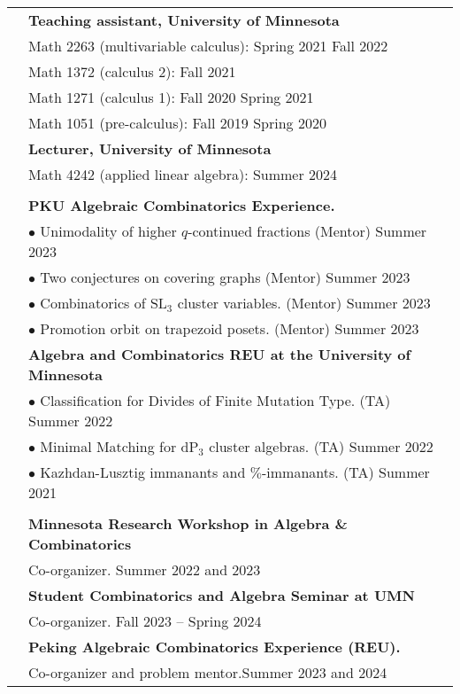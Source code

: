 \documentclass[letterpaper, 11pt,times]{article}
\newcommand{\mycolor}[0]{\color{RoyalBlue}}
\newlength{\myl}
\newcommand{\ind}[0]{\hspace{\myl}}
\newlength{\newl}
\begin{document}
\begin{longtable}{p{1in}p{5in}}
{\mycolor{Teaching}} 
& \textbf{Teaching assistant, University of Minnesota}  \\
&\ind  Math 2263 (multivariable calculus): Spring 2021 Fall 2022\\
&\ind  Math 1372 (calculus 2): Fall 2021\\
&\ind  Math 1271 (calculus 1): Fall 2020 Spring 2021\\
&\ind  Math 1051 (pre-calculus): Fall 2019 Spring 2020\\
& \textbf{Lecturer, University of Minnesota}  \\
&\ind  Math 4242 (applied linear algebra): Summer 2024\\
\\
{\mycolor{Mentoring}} 
&\textbf{PKU Algebraic Combinatorics Experience.}\\
&\ind $\bullet$ Unimodality of higher $q$-continued fractions (Mentor) \hfill Summer 2023\\
&\ind $\bullet$ Two conjectures on covering graphs (Mentor) \hfill Summer 2023\\
&\ind $\bullet$ Combinatorics of $\text{SL}_3$ cluster variables. (Mentor) \hfill Summer 2023\\
&\ind $\bullet$ Promotion orbit on trapezoid posets. (Mentor) \hfill Summer 2023\\
& \textbf{Algebra and Combinatorics REU at the University of Minnesota}  \\
&\ind $\bullet$ Classification for Divides of Finite Mutation Type. (TA)  \hfill Summer 2022\\
&\ind $\bullet$ Minimal Matching for $\text{dP}_3$ cluster algebras. (TA) \hfill Summer 2022\\
&\ind  $\bullet$ Kazhdan-Lusztig immanants and $\%$-immanants. (TA) \hfill Summer 2021\\
& \\

{\mycolor{Organization}} 
& \textbf{Minnesota Research Workshop in Algebra \& Combinatorics}  \\
&\ind Co-organizer. \hfill{Summer 2022 and 2023} \\
& \textbf{Student Combinatorics and Algebra Seminar at UMN}  \\
&\ind Co-organizer. \hfill {Fall 2023 -- Spring 2024}\\
& \textbf{Peking Algebraic Combinatorics Experience (REU).}\\
&\ind Co-organizer and problem mentor.\hfill{Summer 2023 and 2024}
\\



\end{longtable}
\end{document}
